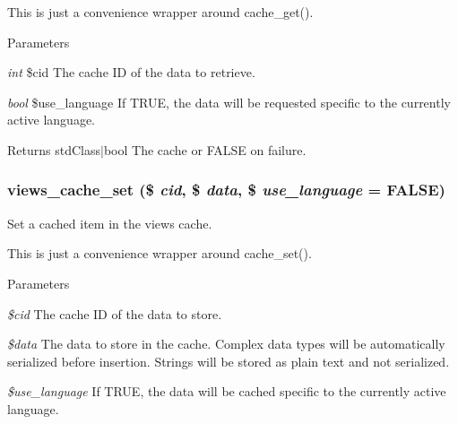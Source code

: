 This is just a convenience wrapper around cache\_\-get().


\begin{DoxyParams}{Parameters}
\item[{\em int}]\$cid The cache ID of the data to retrieve. \item[{\em bool}]\$use\_\-language If TRUE, the data will be requested specific to the currently active language.\end{DoxyParams}
\begin{DoxyReturn}{Returns}
stdClass$|$bool The cache or FALSE on failure. 
\end{DoxyReturn}
\hypertarget{views_2includes_2cache_8inc_a40508277eb295523eb45a067c8a84324}{
\subsubsection[{views\_\-cache\_\-set}]{\setlength{\rightskip}{0pt plus 5cm}views\_\-cache\_\-set (\$ {\em cid}, \/  \$ {\em data}, \/  \$ {\em use\_\-language} = {\ttfamily FALSE})}}
\label{views_2includes_2cache_8inc_a40508277eb295523eb45a067c8a84324}
Set a cached item in the views cache.

This is just a convenience wrapper around cache\_\-set().


\begin{DoxyParams}{Parameters}
\item[{\em \$cid}]The cache ID of the data to store. \item[{\em \$data}]The data to store in the cache. Complex data types will be automatically serialized before insertion. Strings will be stored as plain text and not serialized. \item[{\em \$use\_\-language}]If TRUE, the data will be cached specific to the currently active language. \end{DoxyParams}
